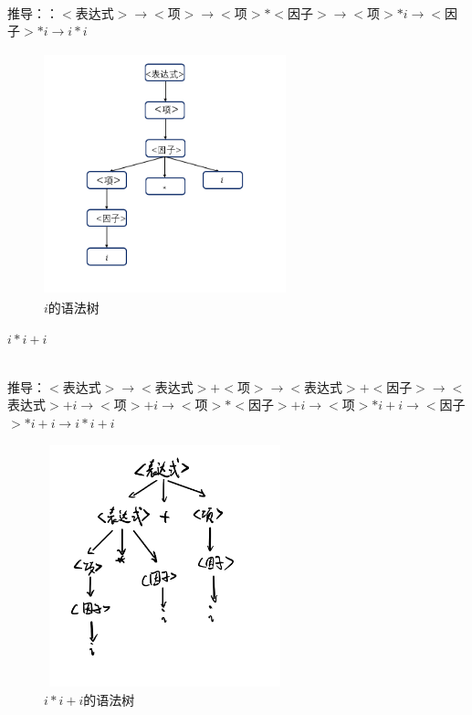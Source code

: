 \documentclass{cisXXX} %
\begin{document}
\begin{CJK}{UTF8}{gbsn}
~\\推导：：$<$表达式$>\rightarrow <$项$>\rightarrow<$项$>*<$因子$>\rightarrow<$项$>*i\rightarrow <$因子$>*i\rightarrow i*i$
\HWsubproblem 
\begin{figure}[ht]
	\centering
	\includegraphics[width=7cm,height=7cm]{1_3.png}
	\caption{$i$的语法树}
	\label{fig:label}
\end{figure}    
$i*i+i$

~\\推导：$<$表达式$>\rightarrow <$表达式$>+<$项$>\rightarrow <$表达式$>+<$因子$>\rightarrow <$表达式$>+i\rightarrow <$项$>+i\rightarrow <$项$>*<$因子$>+i\rightarrow <$项$>*i+i\rightarrow <$因子$>*i+i\rightarrow i*i+i$
\begin{figure}[ht]
	\centering
	\includegraphics[width=7cm,height=7cm]{1_4.png}
	\caption{$i*i+i$的语法树}
	\label{fig:label}
\end{figure}  
~\\
~\\
~\\
~\\
~\\

\HWsubproblem 



\end{CJK}
\end{document}
